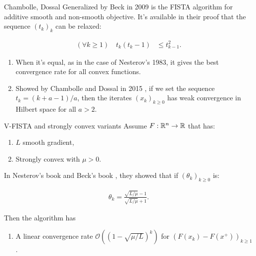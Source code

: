 \documentclass[11pt]{beamer}
\theoremstyle{definition}
\begin{document}
        \begin{frame}{Chambolle, Dossal}
            Generalized by Beck \cite{beck_fast_2009-1} in 2009 is the FISTA algorithm for additive smooth and non-smooth objective. 
            It's available in their proof that the sequence $(t_k)_{k}$ can be relaxed: 
            \begin{tcolorbox}\noindent\vspace{-1em}
                \begin{align*}
                    (\forall k \ge 1)\quad t_k (t_k - 1) &\le t_{k - 1}^2. 
                \end{align*}    
            \end{tcolorbox}
            \begin{enumerate}
                \item When it's equal, as in the case of Nesterov's 1983, it gives the best convergence rate for all convex functions. 
                \item Showed by Chambolle and Dossal in 2015 \cite{chambolle_convergence_2015}, if we set the sequence $t_k = (k + a -1)/a$, then the iterates $(x_k)_{k \ge 0}$ has weak convergence in Hilbert space for all $a > 2$. 
            \end{enumerate}
        \end{frame}
        \begin{frame}{V-FISTA and strongly convex variants}
            Assume $F:\mathbb R^n \rightarrow \mathbb R$ that has:
            \begin{enumerate}
                \item $L$ smooth gradient, 
                \item Strongly convex with $\mu > 0$. 
            \end{enumerate}
            In Nesterov's book \cite{nesterov_lectures_2018} and Beck's book \cite{beck_first-order_2017}, they showed that if $(\theta_k)_{k\ge 0}$ is:
            \begin{tcolorbox}
                \begin{align*}
                   \theta_k = \frac{\sqrt{L/\mu} - 1}{\sqrt{L/\mu} + 1}. 
                \end{align*}
            \end{tcolorbox}
            Then the algorithm has
            \begin{enumerate}
                \item A linear convergence rate $\mathcal O((1 - \sqrt{\mu/L})^k)$ for $(F(x_k) - F(x^+))_{k \ge 1}$. 
            \end{enumerate}
        \end{frame}
\end{document}
